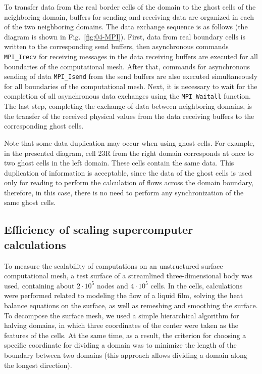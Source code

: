 To transfer data from the real border cells of the domain to the ghost cells of the neighboring domain, buffers for sending and receiving data are organized in each of the two neighboring domains.
The data exchange sequence is as follows (the diagram is shown in Fig.~\ref{fig:04-MPI}).
First, data from real boundary cells is written to the corresponding send buffers, then asynchronous commands \texttt{MPI\_Irecv} for receiving messages in the data receiving buffers are executed for all boundaries of the computational mesh.
After that, commands for asynchronous sending of data \texttt{MPI\_Isend} from the send buffers are also executed simultaneously for all boundaries of the computational mesh.
Next, it is necessary to wait for the completion of all asynchronous data exchanges using the \texttt{MPI\_Waitall} function.
The last step, completing the exchange of data between neighboring domains, is the transfer of the received physical values from the data receiving buffers to the corresponding ghost cells.

Note that some data duplication may occur when using ghost cells.
For example, in the presented diagram, cell 23R from the right domain corresponds at once to two ghost cells in the left domain.
These cells contain the same data.
This duplication of information is acceptable, since the data of the ghost cells is used only for reading to perform the calculation of flows across the domain boundary, therefore, in this case, there is no need to perform any synchronization of the same ghost cells.

\subsection{Efficiency of scaling supercomputer calculations}

To measure the scalability of computations on an unstructured surface computational mesh, a test surface of a streamlined three-dimensional body was used, containing about $ 2 \cdot 10^5 $ nodes and $ 4 \cdot 10^5 $ cells.
In the cells, calculations were performed related to modeling the flow of a liquid film, solving the heat balance equations on the surface, as well as remeshing and smoothing the surface.
To decompose the surface mesh, we used a simple hierarchical algorithm for halving domains, in which three coordinates of the center were taken as the features of the cells.
At the same time, as a result, the criterion for choosing a specific coordinate for dividing a domain was to minimize the length of the boundary between two domains (this approach allows dividing a domain along the longest direction).

